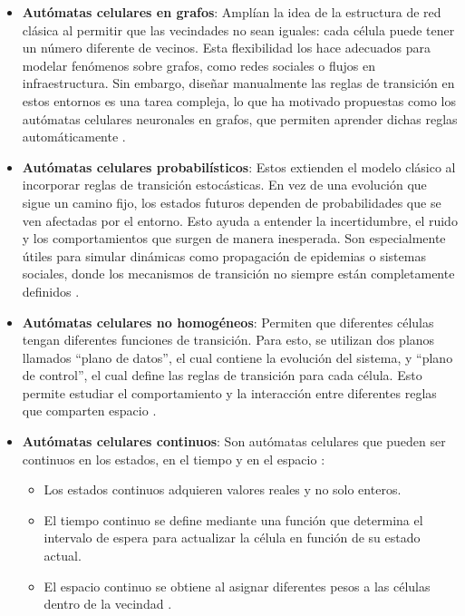 \begin{itemize}
	
	\item \textbf{Autómatas celulares en grafos}: Amplían la idea de la estructura de red clásica al permitir que las vecindades no sean iguales: cada célula puede tener un número diferente de vecinos. Esta flexibilidad los hace adecuados para modelar fenómenos sobre grafos, como redes sociales o flujos en infraestructura. Sin embargo, diseñar manualmente las reglas de transición en estos entornos es una tarea compleja, lo que ha motivado propuestas como los autómatas celulares neuronales en grafos, que permiten aprender dichas reglas automáticamente \cite{grattarola2021_gca}.
	
	\item \textbf{Autómatas celulares probabilísticos}: Estos extienden el modelo clásico al incorporar reglas de transición estocásticas. En vez de una evolución que sigue un camino fijo, los estados futuros dependen de probabilidades que se ven afectadas por el entorno. Esto ayuda a entender la incertidumbre, el ruido y los comportamientos que surgen de manera inesperada. Son especialmente útiles para simular dinámicas como propagación de epidemias o sistemas sociales, donde los mecanismos de transición no siempre están completamente definidos \cite{gacs2024_pca}.
	
	\item \textbf{Autómatas celulares no homogéneos}: Permiten que diferentes células tengan diferentes funciones de transición. Para esto, se utilizan dos planos llamados ``plano de datos'', el cual contiene la evolución del sistema, y ``plano de control'', el cual define las reglas de transición para cada célula. Esto permite estudiar el comportamiento y la interacción entre diferentes reglas que comparten espacio \cite{hartman1987_ihca}.
	
	\item \textbf{Autómatas celulares continuos}: Son autómatas celulares que pueden ser continuos en los estados, en el tiempo y en el espacio \cite{Wolfram2002_nks}:
	
	\begin{itemize}
		\item Los estados continuos adquieren valores reales y no solo enteros.
		
		\item El tiempo continuo se define mediante una función que determina el intervalo de espera para actualizar la célula en función de su estado actual.
		
		\item El espacio continuo se obtiene al asignar diferentes pesos a las células dentro de la vecindad \cite{becker2023_cca}.
	\end{itemize}
\end{itemize}

